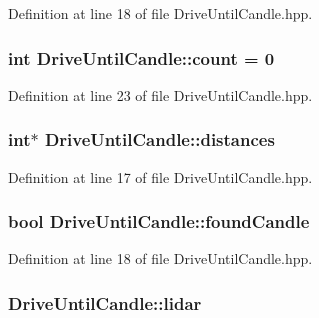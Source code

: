 Definition at line 18 of file Drive\-Until\-Candle.\-hpp.

\hypertarget{classDriveUntilCandle_a518d428f126c93f016e62c8b1ac88c2f}{
\subsubsection[{count}]{\setlength{\rightskip}{0pt plus 5cm}int Drive\-Until\-Candle\-::count = 0\hspace{0.3cm}{\ttfamily [private]}}}\label{classDriveUntilCandle_a518d428f126c93f016e62c8b1ac88c2f}


Definition at line 23 of file Drive\-Until\-Candle.\-hpp.

\hypertarget{classDriveUntilCandle_ab1308b79db403f3c35b2d84b8254c349}{
\subsubsection[{distances}]{\setlength{\rightskip}{0pt plus 5cm}int$\ast$ Drive\-Until\-Candle\-::distances\hspace{0.3cm}{\ttfamily [private]}}}\label{classDriveUntilCandle_ab1308b79db403f3c35b2d84b8254c349}


Definition at line 17 of file Drive\-Until\-Candle.\-hpp.

\hypertarget{classDriveUntilCandle_a99cfadc7663aebef445e59d721dfe0bc}{
\subsubsection[{found\-Candle}]{\setlength{\rightskip}{0pt plus 5cm}bool Drive\-Until\-Candle\-::found\-Candle\hspace{0.3cm}{\ttfamily [private]}}}\label{classDriveUntilCandle_a99cfadc7663aebef445e59d721dfe0bc}


Definition at line 18 of file Drive\-Until\-Candle.\-hpp.

\hypertarget{classDriveUntilCandle_a483790cb5a28465c04fd6c42374d85ac}{
\subsubsection[{lidar}]{ Drive\-Until\-Candle\-::lidar\hspace{0.3cm}{\ttfamily [private]}}}\label{classDriveUntilCandle_a483790cb5a28465c04fd6c42374d85ac}


